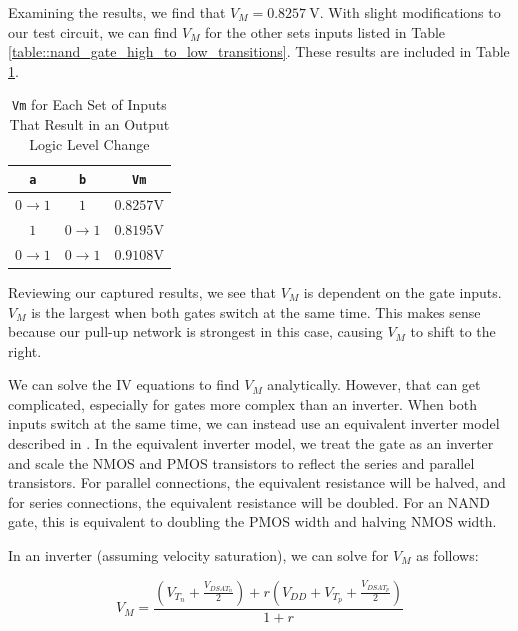 \documentclass{article}
\begin{document}
	Examining the results, we find that $V_M = 0.8257\ \text{V}$. With slight modifications to our test circuit, we can find $V_M$ for the other sets inputs listed in Table \ref{table::nand_gate_high_to_low_transitions}. These results are included in Table \ref{table::nand_gate_vm}.
	
	\begin{table}[H]
	\begin{center}
	\caption{\texttt{Vm} for Each Set of Inputs That Result in an Output Logic Level Change}
	\label{table::nand_gate_vm}
	\begin{tabular}{| c | c | c |}
		\hline
		\texttt{a} & \texttt{b} & \texttt{Vm}\\
		\hline	
		$0 \rightarrow 1$ & $1$ & $0.8257 \text{V}$\\
		\hline	
		$1$ & $0 \rightarrow 1$ & $0.8195 \text{V}$\\
		\hline	
		$0 \rightarrow 1$ & $0 \rightarrow 1$ & $0.9108 \text{V}$\\
		\hline
	\end{tabular}
	\end{center}
	\end{table}
	
	\noindent Reviewing our captured results, we see that $V_M$ is dependent on the gate inputs. $V_M$ is the largest when both gates switch at the same time. This makes sense because our pull-up network is strongest in this case, causing $V_M$ to shift to the right.
	
	We can solve the IV equations to find $V_M$ analytically. However, that can get complicated, especially for gates more complex than an inverter. When both inputs switch at the same time, we can instead use an equivalent inverter model described in \cite{cmos_vlsi_design, equivalent_inverter, inverter_dc_analysis}. In the equivalent inverter model, we treat the gate as an inverter and scale the NMOS and PMOS transistors to reflect the series and parallel transistors. For parallel connections, the equivalent resistance will be halved, and for series connections, the equivalent resistance will be doubled. For an NAND gate, this is equivalent to doubling the PMOS width and halving NMOS width.
	
	In an inverter (assuming velocity saturation), we can solve for $V_M$ as follows:
	
	\begin{equation}
		\label{eq::vm}
		V_{M} = \frac{\left(V_{T_n} + \frac{V_{DSAT_n}}{2}\right) + r\left(V_{DD} + V_{T_p} + \frac{V_{DSAT_p}}{2}\right)}{1 + r}
	\end{equation}
	
\end{document}
